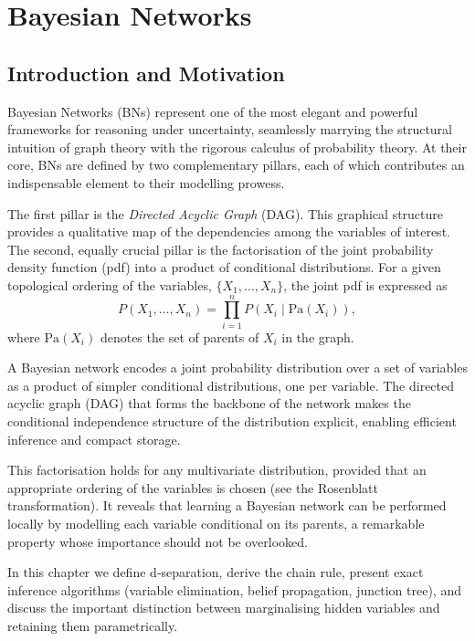 \startcontents[chapter]
\chapter{Bayesian Networks}
\label{ch:bayesiannetworks}
\minitocboxed

\section{Introduction and Motivation}

Bayesian Networks (BNs) represent one of the most elegant and powerful frameworks for reasoning under uncertainty, seamlessly marrying the structural intuition of graph theory with the rigorous calculus of probability theory. At their core, BNs are defined by two complementary pillars, each of which contributes an indispensable element to their modelling prowess.

The first pillar is the \emph{Directed Acyclic Graph} (DAG). This graphical structure provides a qualitative map of the dependencies among the variables of interest. The second, equally crucial pillar is the factorisation of the joint probability density function (pdf) into a product of conditional distributions. For a given topological ordering of the variables, \(\{X_1, \dots, X_n\}\), the joint pdf is expressed as\hat{}
\[
P(X_1, \dots, X_n) = \prod_{i=1}^{n} P(X_i \mid \mathrm{Pa}(X_i)),
\]
where \(\mathrm{Pa}(X_i)\) denotes the set of parents of \(X_i\) in the graph.

A Bayesian network encodes a joint probability distribution over a set of
variables as a product of simpler conditional distributions, one per variable.
The directed acyclic graph (DAG) that forms the backbone of the network makes
the conditional independence structure of the distribution explicit, enabling
efficient inference and compact storage.

This factorisation holds for any multivariate distribution, provided that an appropriate ordering of the variables is chosen (see the Rosenblatt transformation). It reveals that learning a Bayesian network can be performed locally by modelling each variable conditional on its parents, a remarkable property whose importance should not be overlooked.

In this chapter we define d‑separation, derive the chain rule, present exact inference algorithms (variable elimination, belief propagation, junction tree), and discuss the important distinction between marginalising hidden variables and retaining them parametrically.

